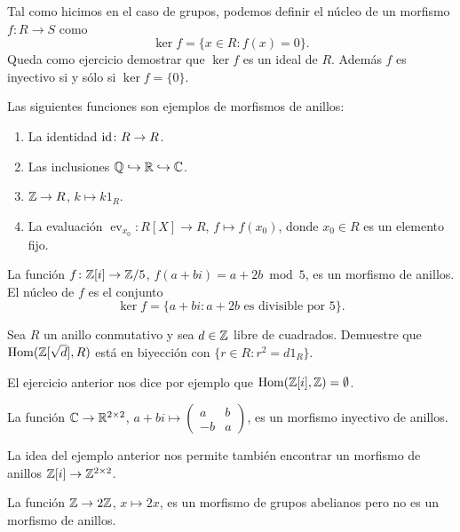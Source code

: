 Tal como hicimos en el caso de grupos, podemos definir el núcleo de un morfismo $f\colon R\to S$ como
\[
\ker f=\{x\in R:f(x)=0\}.
\]
Queda como ejercicio demostrar que $\ker f$ es un ideal de $R$. Además $f$ es inyectivo si y sólo si $\ker f=\{0\}$.  

\begin{examples}
Las siguientes funciones son ejemplos de morfismos de anillos:
\begin{enumerate}
	\item La identidad $\operatorname{id}\colon R\to R$.
	\item Las inclusiones $\mathbb{Q}\hookrightarrow\mathbb{R}\hookrightarrow\mathbb{C}$.
	\item $\mathbb{Z}\to R$, $k\mapsto k1_R$.
	\item La evaluación $\operatorname{ev}_{x_0}\colon R[X]\to R$, $f\mapsto f(x_0)$, donde $x_0\in R$ es un elemento fijo. 
\end{enumerate}
\end{examples}

\begin{example}
La función $f\colon\mathbb{Z}[i]\to\mathbb{Z}/5$, $f(a+bi)=a+2b\bmod 5$, es un morfismo de anillos.	El núcleo de $f$
es el conjunto
\[
\ker f=\{a+bi:a+2b\text{ es divisible por 5}\}.
\] 
\end{example}

\begin{exercise}
\label{xca:Zsqrtd}
Sea $R$ un anillo conmutativo y sea $d\in\mathbb{Z}$ libre de cuadrados.  
Demuestre que $\operatorname{Hom}(\mathbb{Z}[\sqrt{d}],R)$ está en biyección con $\{r\in R:r^2=d1_R\}$. 
\end{exercise}

El ejercicio anterior nos dice por ejemplo que $\operatorname{Hom}(\mathbb{Z}[i],\mathbb{Z})=\emptyset$. 

\begin{example}
La función $\mathbb{C}\to\mathbb{R}^{2\times 2}$, $a+bi\mapsto\begin{pmatrix}a&b\\-b&a\end{pmatrix}$, es un morfismo inyectivo  
de anillos. 
\end{example}

La idea
del ejemplo anterior nos permite también encontrar 
un morfismo de anillos 
$\mathbb{Z}[i]\to\mathbb{Z}^{2\times 2}$.  	

\begin{example}
La función $\mathbb{Z}\to 2\mathbb{Z}$, $x\mapsto 2x$, es un morfismo de grupos abelianos pero no es un morfismo de anillos. 	
\end{example}

